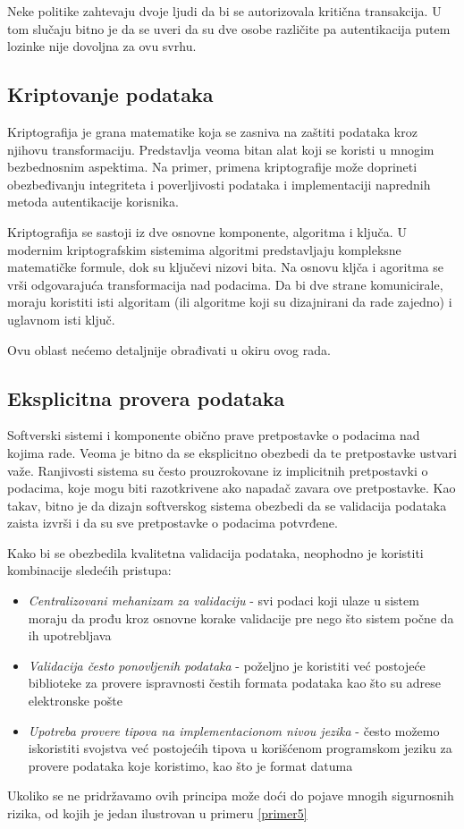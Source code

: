 \documentclass[a4paper]{article}
\begin{document}
Neke politike zahtevaju dvoje ljudi da bi se autorizovala kritična transakcija. U tom slučaju 
bitno je da se uveri da su dve osobe različite pa autentikacija putem lozinke nije dovoljna za ovu svrhu.

\subsection{Kriptovanje podataka}
Kriptografija\cite{CRYP} je grana matematike koja se zasniva na zaštiti podataka kroz njihovu transformaciju. Predstavlja veoma bitan alat koji se koristi u mnogim bezbednosnim aspektima. Na primer, primena kriptografije može doprineti obezbeđivanju integriteta i poverljivosti podataka i implementaciji naprednih metoda autentikacije korisnika.

Kriptografija se sastoji iz dve osnovne komponente, algoritma i ključa. U modernim kriptografskim sistemima algoritmi predstavljaju kompleksne matematičke formule, dok su ključevi nizovi bita. Na osnovu kljča i agoritma se  vrši odgovarajuća transformacija nad podacima. Da bi dve strane komunicirale, moraju koristiti isti algoritam (ili algoritme koji su dizajnirani da rade zajedno) i uglavnom isti ključ.

Ovu oblast nećemo detaljnije obrađivati u okiru ovog rada.


\subsection{Eksplicitna provera podataka}
Softverski sistemi i komponente obično prave pretpostavke o podacima nad kojima rade. Veoma je bitno da se eksplicitno obezbedi da te pretpostavke ustvari važe. Ranjivosti sistema su često prouzrokovane iz implicitnih pretpostavki o podacima, koje mogu biti razotkrivene ako napadač zavara ove pretpostavke.
Kao takav, bitno je da dizajn softverskog sistema obezbedi da se validacija podataka zaista izvrši i da su sve 
pretpostavke o podacima potvrđene.\cite{Top10Flaws}

Kako bi se obezbedila kvalitetna validacija podataka, neophodno je koristiti kombinacije sledećih pristupa:
\begin{itemize}
	\item \textit{Centralizovani mehanizam za validaciju} - svi podaci koji ulaze u sistem moraju da prođu kroz osnovne korake validacije pre nego što sistem počne da ih upotrebljava
	\item \textit{Validacija često ponovljenih podataka} - poželjno je koristiti već postojeće biblioteke za provere ispravnosti čestih formata podataka kao što su adrese elektronske pošte
	\item \textit{Upotreba provere tipova na implementacionom nivou jezika} - često možemo iskoristiti svojstva već postojećih tipova u korišćenom programskom jeziku za provere podataka koje koristimo, kao što je format datuma
\end{itemize}
Ukoliko se ne pridržavamo ovih principa može doći do pojave mnogih sigurnosnih rizika, od kojih je jedan ilustrovan u primeru \ref{primer5}
\end{document}
